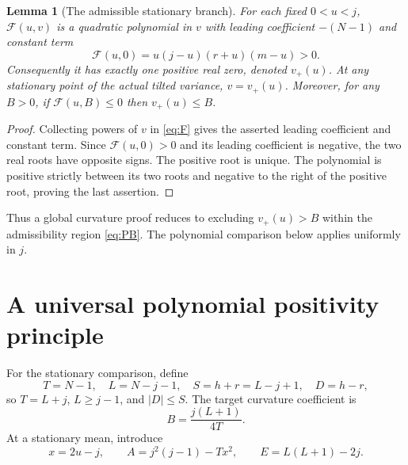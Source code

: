 \documentclass[11pt,a4paper]{article}
\newtheorem{lemma}[theorem]{Lemma}
\begin{document}
\begin{lemma}[The admissible stationary branch]\label{lem:branch}
For each fixed $0<u<j$, $\mathcal F(u,v)$ is a quadratic polynomial in $v$ with leading coefficient $-(N-1)$ and constant term
\begin{equation}\label{eq:F0}
 \mathcal F(u,0)=u(j-u)(r+u)(m-u)>0.
\end{equation}
Consequently it has exactly one positive real zero, denoted $v_+(u)$. At any stationary point of the actual tilted variance, $v=v_+(u)$. Moreover, for any $B>0$, if $\mathcal F(u,B)\le0$ then $v_+(u)\le B$.
\end{lemma}
\begin{proof}
Collecting powers of $v$ in \eqref{eq:F} gives the asserted leading coefficient and constant term. Since $\mathcal F(u,0)>0$ and its leading coefficient is negative, the two real roots have opposite signs. The positive root is unique. The polynomial is positive strictly between its two roots and negative to the right of the positive root, proving the last assertion.
\end{proof}

Thus a global curvature proof reduces to excluding $v_+(u)>B$ within the admissibility region \eqref{eq:PB}. The polynomial comparison below applies uniformly in $j$.
\section{A universal polynomial positivity principle}\label{sec:positive}
For the stationary comparison, define
\begin{equation}\label{eq:letters}
 T=N-1,\quad L=N-j-1,\quad S=h+r=L-j+1,\quad D=h-r,
\end{equation}
so $T=L+j$, $L\ge j-1$, and $|D|\le S$. The target curvature coefficient is
\[
 B=\frac{j(L+1)}{4T}.
\]
At a stationary mean, introduce
\begin{equation}\label{eq:AandE}
 x=2u-j,\qquad A=j^2(j-1)-Tx^2,
 \qquad E=L(L+1)-2j.
\end{equation}
\end{document}
